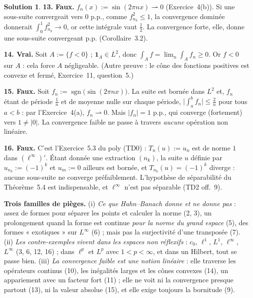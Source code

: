 \documentclass[11pt,a4paper]{article}
\newcommand{\wk}{\rightharpoonup}
\DeclareMathOperator{\sgn}{sgn}
\theoremstyle{definition}
\newtheorem*{solution}{Solution}
\begin{document}
\begin{solution}
\medskip
\noindent\textbf{13. Faux.} $f_n(x):=\sin(2\pi nx)\wk0$ (Exercice~4(b)). Si une sous-suite convergeait vers $0$ p.p., comme $f_{n_k}^2\le1$, la convergence dominée donnerait $\int_0^1f_{n_k}^2\to0$, or cette intégrale vaut $\frac12$. La convergence forte, elle, donne une sous-suite convergeant p.p. (Corollaire~3.2).

\medskip
\noindent\textbf{14. Vrai.} Soit $A:=\{f<0\}$ ; $\mathbf 1_A\in L^2$, donc $\int_Af=\lim_n\int_Af_n\ge0$. Or $f<0$ sur $A$ : cela force $A$ négligeable. (Autre preuve : le cône des fonctions positives est convexe et fermé, Exercice~11, question~5.)

\medskip
\noindent\textbf{15. Faux.} Soit $f_n:=\sgn\big(\sin(2\pi nx)\big)$. La suite est bornée dans $L^2$ et, $f_n$ étant de période $\frac1n$ et de moyenne nulle sur chaque période, $\big|\int_a^bf_n\big|\le\frac2n$ pour tous $a<b$ : par l'Exercice~4(a), $f_n\wk0$. Mais $|f_n|=1$ p.p., qui converge (fortement) vers $1\ne|0|$. La convergence faible ne passe à travers \emph{aucune} opération non linéaire.

\medskip
\noindent\textbf{16. Faux.} C'est l'Exercice~5.3 du poly (TD0) : $T_n(u):=u_n$ est de norme $1$ dans $(\ell^\infty)'$. Étant donnée une extraction $(n_k)$, la suite $u$ définie par $u_{n_k}:=(-1)^k$ et $u_m:=0$ ailleurs est bornée, et $T_{n_k}(u)=(-1)^k$ diverge : aucune sous-suite ne converge préfaiblement. L'hypothèse de séparabilité du Théorème~5.4 est indispensable, et $\ell^\infty$ n'est pas séparable (TD2 off.~9).
\end{solution}

\begin{pointcle}
\textbf{Trois familles de pièges.} (i) \emph{Ce que Hahn--Banach donne et ne donne pas} : assez de formes pour séparer les points et calculer la norme (2, 3), un prolongement quand la forme est continue \emph{pour la norme du grand espace} (5), des formes « exotiques » sur $L^\infty$ (6) ; mais pas la surjectivité d'une transposée (7). (ii) \emph{Les contre-exemples vivent dans les espaces non réflexifs} : $c_0$, $\ell^1$, $L^1$, $\ell^\infty$, $L^\infty$ (3, 6, 12, 16) ; dans $\ell^p$ et $L^p$ avec $1<p<\infty$, et dans un Hilbert, tout se passe bien. (iii) \emph{La convergence faible est une notion linéaire} : elle traverse les opérateurs continus (10), les inégalités larges et les cônes convexes (14), un appariement avec un facteur fort (11) ; elle ne voit ni la convergence presque partout (13), ni la valeur absolue (15), et elle exige toujours la bornitude (9).
\end{pointcle}
\end{document}

